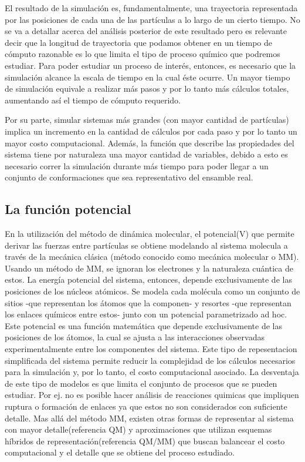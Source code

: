 

El resultado de la simulación es, fundamentalmente, una trayectoria representada por las posiciones de cada una de las partículas a lo largo de un cierto tiempo.
No se va a detallar acerca del análisis posterior de este resultado pero es relevante decir que la longitud de trayectoria que podamos obtener en un tiempo de cómputo razonable es lo que limita el tipo de proceso químico que podremos estudiar.
Para poder estudiar un proceso de interés, entonces, es necesario que la simulación alcance la escala de tiempo en la cual éste ocurre. Un mayor tiempo de simulación equivale a realizar más pasos y por lo tanto más cálculos totales, aumentando así el tiempo de cómputo requerido.

Por su parte, simular sistemas más grandes (con mayor cantidad de partículas) implica un incremento en la cantidad de cálculos por cada paso y por lo tanto un mayor costo computacional. Además, la función que describe las propiedades del sistema tiene por naturaleza una mayor cantidad de variables, debido a esto es necesario correr la simulación durante más tiempo para poder llegar a un conjunto de conformaciones que sea representativo del ensamble real.




\subsection{La función potencial}


En la utilización del método de dinámica molecular, el potencial(V) que permite derivar las fuerzas entre partículas se obtiene modelando al sistema molecula a través de la mecánica clásica (método conocido como mecánica molecular o MM).
Usando un método de MM, se ignoran los electrones y la naturaleza cuántica de estos. La energía potencial del sistema, entonces, depende exclusivamente de las posiciones de los núcleos atómicos. Se modela cada molécula como un conjunto de sitios -que representan los átomos que la componen- y resortes -que representan los enlaces químicos entre estos- junto con un potencial parametrizado ad hoc.
Este potencial es una función matemática que depende exclusivamente de las posiciones de los átomos, la cual se ajusta a las interacciones observadas experimentalmente entre los componentes del sistema. Este tipo de repesentacion simplificada del sistema permite reducir la complejidad de los cálculos necesarios para la simulación y, por lo tanto, el costo computacional asociado. La desventaja de este tipo de modelos es que limita el conjunto de procesos que se pueden estudiar. Por ej. no es posible hacer análisis de reacciones quimicas que impliquen ruptura o formación de enlaces ya que estos no son considerados con suficiente detalle. 
Mas allá del método MM, existen otras formas de representar al sistema con mayor detalle(referencia QM) y aproximaciones que utilizan esquemas híbridos de representación(referencia QM/MM) que buscan balancear el costo computacional y el detalle que se obtiene del proceso estudiado.

